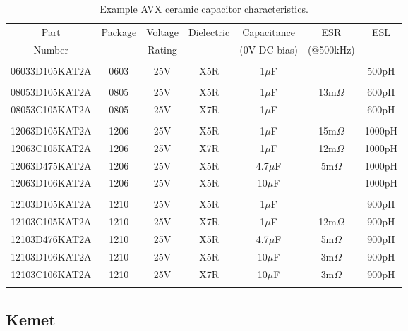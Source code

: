 \documentclass[10pt,twoside]{article}
\begin{document}

\begin{table}[p]
\caption{Example AVX ceramic capacitor characteristics.}
\label{tab:avx_caps}
\begin{center}
\begin{tabular}{|c|c|c|c|c|c|c|}
\hline
Part   & Package & Voltage & Dielectric & Capacitance  & ESR       & ESL\\
Number &         & Rating  &            & (0V DC bias) & (@500kHz) & \\
\hline\hline
&&&&&&\\
06033D105KAT2A & 0603 & 25V & X5R & 1$\mu$F &             & 500pH\\
&&&&&&\\
08053D105KAT2A & 0805 & 25V & X5R & 1$\mu$F & 13m$\Omega$ & 600pH\\
08053C105KAT2A & 0805 & 25V & X7R & 1$\mu$F &             & 600pH\\
&&&&&&\\
12063D105KAT2A & 1206 & 25V & X5R &   1$\mu$F & 15m$\Omega$ & 1000pH\\
12063C105KAT2A & 1206 & 25V & X7R &   1$\mu$F & 12m$\Omega$ & 1000pH\\
12063D475KAT2A & 1206 & 25V & X5R & 4.7$\mu$F &  5m$\Omega$ & 1000pH\\
12063D106KAT2A & 1206 & 25V & X5R &  10$\mu$F &             & 1000pH\\
&&&&&&\\
12103D105KAT2A & 1210 & 25V & X5R &   1$\mu$F &             & 900pH\\
12103C105KAT2A & 1210 & 25V & X7R &   1$\mu$F & 12m$\Omega$ & 900pH\\
12103D476KAT2A & 1210 & 25V & X5R & 4.7$\mu$F &  5m$\Omega$ & 900pH\\
12103D106KAT2A & 1210 & 25V & X5R &  10$\mu$F &  3m$\Omega$ & 900pH\\
12103C106KAT2A & 1210 & 25V & X7R &  10$\mu$F &  3m$\Omega$ & 900pH\\
&&&&&&\\
\hline
\end{tabular}
\end{center}
\end{table}

\clearpage
\subsection{Kemet}
\end{document}
